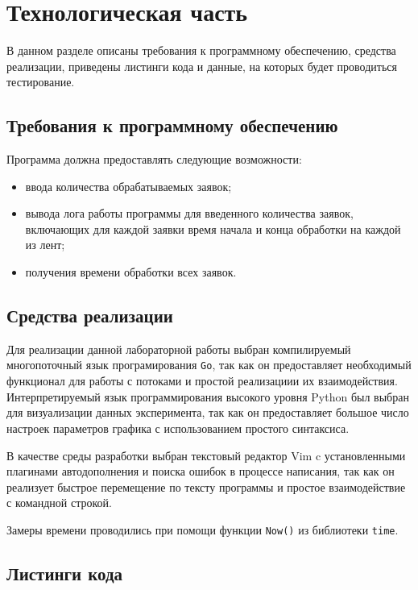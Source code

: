 \chapter{Технологическая часть}

В данном разделе описаны требования к программному обеспечению, средства
реализации, приведены листинги кода и данные, на которых будет проводиться
тестирование.

\section{Требования к программному обеспечению}

Программа должна предоставлять следующие возможности:
\begin{itemize}[left=\parindent]
    \item ввода количества обрабатываемых заявок;
    \item вывода лога работы программы для введенного количества заявок,
        включающих для каждой заявки время начала и конца обработки на каждой
        из лент;
    \item получения времени обработки всех заявок.
\end{itemize}

\section{Средства реализации}

Для реализации данной лабораторной работы выбран компилируемый многопоточный
язык програмирования \texttt{Go}\cite{golang}, так как он предоставляет
необходимый функционал для работы с потоками и простой реализациии их
взаимодействия. Интерпретируемый язык программирования высокого уровня
Python\cite{python} был выбран для визуализации данных эксперимента, так как он
предоставляет большое число настроек параметров графика с использованием
простого синтаксиса. 

В качестве среды разработки выбран текстовый редактор Vim\cite{vim} c
установленными плагинами автодополнения и поиска ошибок в процессе написания,
так как он реализует быстрое перемещение по тексту программы и простое
взаимодействие с командной строкой.

Замеры времени проводились при помощи функции \texttt{Now()}
из библиотеки \texttt{time}\cite{time}.

\newpage
\section{Листинги кода}

